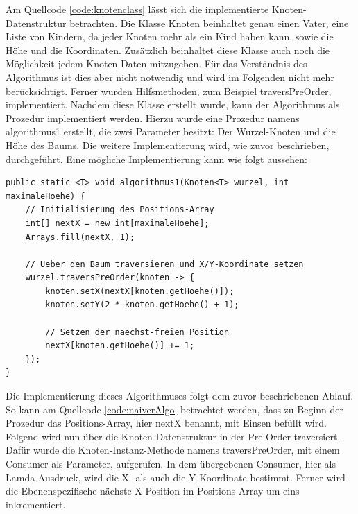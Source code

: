 Am Quellcode \ref{code:knotenclass} lässt sich die implementierte Knoten-Datenstruktur betrachten. Die Klasse Knoten beinhaltet genau einen
Vater, eine Liste von Kindern, da jeder Knoten mehr als ein Kind haben kann, sowie die Höhe und die Koordinaten. Zusätzlich beinhaltet diese 
Klasse auch noch die Möglichkeit jedem Knoten Daten mitzugeben. Für das Verständnis des Algorithmus ist dies aber nicht notwendig und wird
im Folgenden nicht mehr berücksichtigt. Ferner wurden Hilfsmethoden, zum Beispiel \glqq traversPreOrder\grqq{}, implementiert. Nachdem diese Klasse erstellt wurde, 
kann der Algorithmus als Prozedur implementiert werden.
Hierzu wurde eine Prozedur namens \glqq algorithmus1\grqq{} erstellt, die zwei Parameter besitzt: Der Wurzel-Knoten
und die Höhe des Baums. Die weitere Implementierung wird, wie zuvor beschrieben, durchgeführt. Eine mögliche Implementierung
kann wie folgt aussehen:

\newpage
\begin{lstlisting}[caption=Implementierung des naiven Algorithmus, label=code:naiverAlgo]
public static <T> void algorithmus1(Knoten<T> wurzel, int maximaleHoehe) {
	// Initialisierung des Positions-Array
	int[] nextX = new int[maximaleHoehe];
	Arrays.fill(nextX, 1);
	
	// Ueber den Baum traversieren und X/Y-Koordinate setzen
	wurzel.traversPreOrder(knoten -> {
		knoten.setX(nextX[knoten.getHoehe()]);
		knoten.setY(2 * knoten.getHoehe() + 1);
		
		// Setzen der naechst-freien Position
		nextX[knoten.getHoehe()] += 1;
	});
}
\end{lstlisting}

Die Implementierung dieses Algorithmuses folgt dem zuvor beschriebenen Ablauf. So kann am Quellcode \ref{code:naiverAlgo} betrachtet werden, dass zu
Beginn der Prozedur das Positions-Array, hier \glqq nextX\grqq{} benannt, mit Einsen befüllt wird. Folgend wird nun über die Knoten-Datenstruktur
in der Pre-Order traversiert. Dafür wurde die Knoten-Instanz-Methode namens \glqq traversPreOrder\grqq{}, mit einem Consumer als Parameter, aufgerufen.
In dem übergebenen Consumer, hier als Lamda-Ausdruck, wird die X- als auch die Y-Koordinate bestimmt. Ferner wird die
Ebenenspezifische nächste X-Position im Positions-Array um eins inkrementiert.

